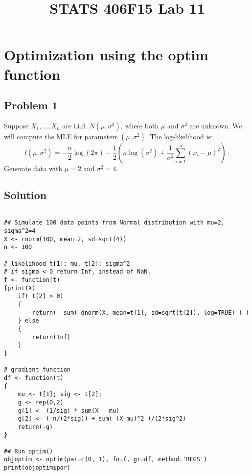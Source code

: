 \documentclass[12pt]{article}
\begin{document}

\title{\Large \bf STATS 406F15 Lab 11}
\date{}

\maketitle





\section{Optimization using the optim function}

\subsection*{Problem 1}

Suppose $X_1, \ldots, X_n$ are i.i.d. $N(\mu, \sigma^2)$, where both $\mu$ and $\sigma^2$ are unknown. We will compute the MLE for parameters $(\mu, \sigma^2)$. The log-likelihood is:
$$l(\mu, \sigma^2) = -\frac{n}{2} \log(2 \pi ) -\frac{1}{2} (n \log(\sigma^2 ) + \frac{1}{\sigma^2} \sum_{i=1}^n (x_i - \mu)^2) \ .$$
Generate data with $\mu=2$ and $\sigma^2=4$.

\subsection*{Solution}

\begin{verbatim}

## Simulate 100 data points from Normal distribution with mu=2, sigma^2=4
X <- rnorm(100, mean=2, sd=sqrt(4))
n <- 100

# likelihood t[1]: mu, t[2]: sigma^2
# if sigma < 0 return Inf, instead of NaN.
f <- function(t)
{print(X)
    if( t[2] > 0)
    {
        return( -sum( dnorm(X, mean=t[1], sd=sqrt(t[2]), log=TRUE) ) )
    } else
    {
        return(Inf)
    }
}

# gradient function
df <- function(t)
{
    mu <- t[1]; sig <- t[2];
    g <- rep(0,2)
    g[1] <- (1/sig) * sum(X - mu)
    g[2] <- (-n/(2*sig)) + sum( (X-mu)^2 )/(2*sig^2)
    return(-g)
}

## Run optim() 
objoptim <- optim(par=c(0, 1), fn=f, gr=df, method='BFGS')
print(objoptim$par)

\end{verbatim}
\end{document}
